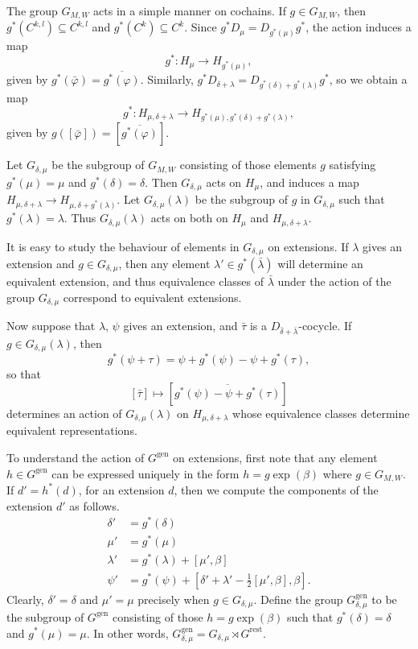 \documentclass[12pt]{amsart}
\theoremstyle{definition}
\begin{document}
The group ${\mbox{$G_{M,W}$}}$ acts in a simple manner on cochains. If
$g\in{\mbox{$G_{M,W}$}}$, then $g^*(C^{k,l})\subseteq C^{k,l}$ and
$g^*(C^k)\subseteq C^k$. Since $g^*D_\mu=D_{g^*(\mu)}g^*$, the
action induces a map $$g^*:H_\mu{\rightarrow} H_{g^*(\mu)},$$ given by
$g^*(\bar{\varphi})=\overline{g^*({\varphi})}$. Similarly,
$g^*D_{\delta+\lambda}=D_{g^*(\delta)+g^*(\lambda)}g^*$, so we obtain a map
$$g^*:H_{\mu,{\delta+\lambda}}{\rightarrow} H_{g^*(\mu),g^*(\delta)+g^*(\lambda)},$$
given by $g([\bar{\varphi}])=[\overline{g^*({\varphi})}]$.

Let ${\mbox{$G_{\delta,\mu}$}}$ be the subgroup of ${\mbox{$G_{M,W}$}}$ consisting of those
elements $g$ satisfying $g^*(\mu)=\mu$ and $g^*(\delta)=\delta$.
Then ${\mbox{$G_{\delta,\mu}$}}$ acts on $H_\mu$, and induces a map $H_{\mu,{\delta+\lambda}}{\rightarrow}
H_{\mu,\delta+g^*(\lambda)}$. Let ${\mbox{${\mbox{$G_{\delta,\mu}$}}(\lambda)$}}$ be the subgroup of $g$
in ${\mbox{$G_{\delta,\mu}$}}$ such that $g^*(\lambda)=\lambda$. Thus ${\mbox{${\mbox{$G_{\delta,\mu}$}}(\lambda)$}}$
acts on both on $H_\mu$ and $H_{\mu,{\delta+\lambda}}$.

It is easy to study the behaviour of elements in ${\mbox{$G_{\delta,\mu}$}}$ on
extensions. If $\lambda$ gives an extension and $g\in{\mbox{$G_{\delta,\mu}$}}$,
then any element $\lambda'\in g^*(\bar\lambda)$ will determine an
equivalent extension, and thus equivalence classes of
$\bar\lambda$ under the action of the group ${\mbox{$G_{\delta,\mu}$}}$ correspond
to equivalent extensions.

Now suppose that $\lambda$, $\psi$ gives an extension, and
$\bar\tau$ is a $D_{\bar\delta+\bar\lambda}$-cocycle. If $g\in{\mbox{${\mbox{$G_{\delta,\mu}$}}(\lambda)$}}$, then
$$g^*(\psi+\tau)=\psi+g^*(\psi)-\psi + g^*(\tau),$$ so that
$$[\bar\tau]\mapsto [\overline{g^*(\psi)-\psi +g^*(\tau)}]$$
determines an action of ${\mbox{${\mbox{$G_{\delta,\mu}$}}(\lambda)$}}$ on $H_{\mu,{\delta+\lambda}}$ whose
equivalence classes determine equivalent representations.

To understand the action of ${\mbox{$G^{\text{gen}}$}}$ on extensions, first note that
any element $h\in{\mbox{$G^{\text{gen}}$}}$ can be expressed uniquely in the form
$h=g\exp(\beta)$ where $g\in{\mbox{$G_{M,W}$}}$. If $d'=h^*(d)$, for an
extension $d$, then we compute the components of the extension
$d'$ as follows.
\begin{align*}
\delta'&=g^*(\delta)\\
\mu'&=g^*(\mu)\\
\lambda'&=g^*(\lambda)+[\mu',\beta]\\
\psi'&=g^*(\psi)+[\delta'+\lambda'-\tfrac12[\mu',\beta],\beta].
\end{align*}
Clearly, $\delta'=\delta$ and $\mu'=\mu$ precisely when
$g\in{\mbox{$G_{\delta,\mu}$}}$.   Define the group ${\mbox{$G^{\text{gen}}_{\delta,\mu}$}}$ to be the subgroup of
${\mbox{$G^{\text{gen}}$}}$ consisting of those $h=g\exp(\beta)$ such that
$g^*(\delta)=\delta$ and $g^*(\mu)=\mu$. In other words,
${\mbox{$G^{\text{gen}}_{\delta,\mu}$}}={\mbox{$G_{\delta,\mu}$}}\rtimes{\mbox{$G^{\text{rest}}$}}$.
\end{document}
